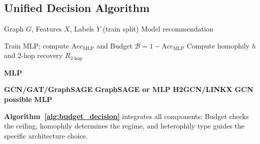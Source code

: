 \subsection{Unified Decision Algorithm}

\begin{algorithm}[t]
\caption{Information Budget Decision Framework}
\label{alg:budget_decision}
\begin{algorithmic}[1]
\Require Graph $G$, Features $X$, Labels $Y$ (train split)
\Ensure Model recommendation

\State Train MLP; compute $\text{Acc}_{\text{MLP}}$ and Budget $\mathcal{B} = 1 - \text{Acc}_{\text{MLP}}$
\State Compute homophily $h$ and 2-hop recovery $R_{2\text{-hop}}$

    \State \Return \textbf{MLP} 
\EndIf

    \State \Return \textbf{GCN/GAT/GraphSAGE} 
    \State \Return \textbf{GraphSAGE or MLP} 
\Else {}
        \State \Return \textbf{H2GCN/LINKX} 
        \State \Return \textbf{GCN possible} 
    \Else
        \State \Return \textbf{MLP} 
    \EndIf
\EndIf
\end{algorithmic}
\end{algorithm}

\textbf{Algorithm~\ref{alg:budget_decision}} integrates all components: Budget checks the ceiling, homophily determines the regime, and heterophily type guides the specific architecture choice.
